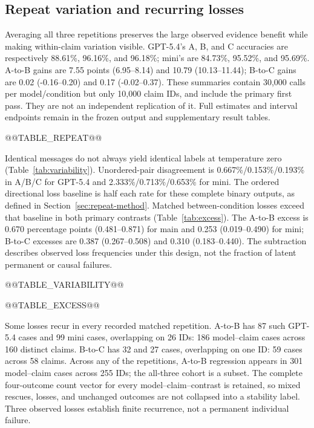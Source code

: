 \documentclass[11pt,letterpaper]{article}
\begin{document}
\subsection{Repeat variation and recurring losses}\label{sec:variation}
Averaging all three repetitions preserves the large observed evidence benefit while making within-claim variation visible. GPT-5.4's A, B, and C accuracies are respectively 88.61\%, 96.16\%, and 96.18\%; mini's are 84.73\%, 95.52\%, and 95.69\%. A-to-B gains are 7.55 points (6.95--8.14) and 10.79 (10.13--11.44); B-to-C gains are 0.02 (-0.16--0.20) and 0.17 (-0.02--0.37). These summaries contain 30,000 calls per model/condition but only 10,000 claim IDs, and include the primary first pass. They are not an independent replication of it. Full estimates and interval endpoints remain in the frozen output and supplementary result tables.

@@TABLE_REPEAT@@

Identical messages do not always yield identical labels at temperature zero (Table~\ref{tab:variability}). Unordered-pair disagreement is 0.667\%/0.153\%/0.193\% in A/B/C for GPT-5.4 and 2.333\%/0.713\%/0.653\% for mini. The ordered directional loss baseline is half each rate for these complete binary outputs, as defined in Section~\ref{sec:repeat-method}. Matched between-condition losses exceed that baseline in both primary contrasts (Table~\ref{tab:excess}). The A-to-B excess is 0.670 percentage points (0.481--0.871) for main and 0.253 (0.019--0.490) for mini; B-to-C excesses are 0.387 (0.267--0.508) and 0.310 (0.183--0.440). The subtraction describes observed loss frequencies under this design, not the fraction of latent permanent or causal failures.

@@TABLE_VARIABILITY@@

@@TABLE_EXCESS@@

Some losses recur in every recorded matched repetition. A-to-B has 87 such GPT-5.4 cases and 99 mini cases, overlapping on 26 IDs: 186 model--claim cases across 160 distinct claims. B-to-C has 32 and 27 cases, overlapping on one ID: 59 cases across 58 claims. Across any of the repetitions, A-to-B regression appears in 301 model--claim cases across 255 IDs; the all-three cohort is a subset. The complete four-outcome count vector for every model--claim--contrast is retained, so mixed rescues, losses, and unchanged outcomes are not collapsed into a stability label. Three observed losses establish finite recurrence, not a permanent individual failure.
\end{document}
